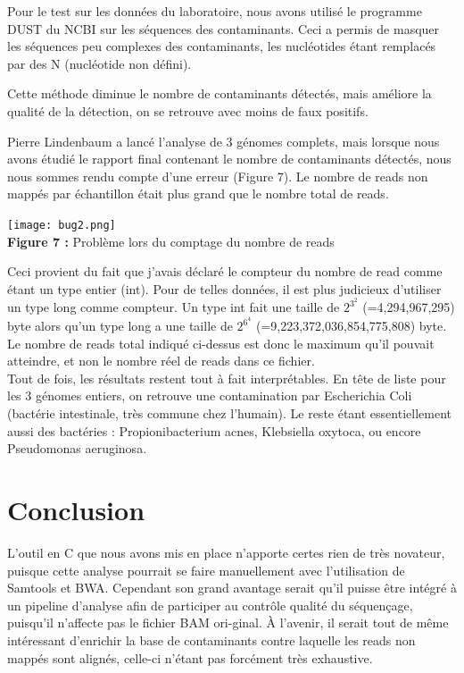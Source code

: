 \documentclass[a4paper,12pt]{article}
\begin{document}
Pour le test sur les données du laboratoire, nous avons utilisé le programme DUST du NCBI sur les séquences des contaminants. Ceci a permis de masquer les séquences peu complexes des contaminants, les nucléotides étant remplacés par des N (nucléotide non défini).

Cette méthode diminue le nombre de contaminants détectés, mais améliore la qualité de la détection, on se retrouve avec moins de faux positifs. 

Pierre Lindenbaum a lancé l'analyse de 3 génomes complets, mais lorsque nous avons étudié le rapport final contenant le nombre de contaminants détectés, nous nous sommes rendu compte d'une erreur (Figure 7). Le nombre de reads non mappés par échantillon était plus grand que le nombre total de reads. 
\begin{center}
 \texttt{[image: bug2.png]}~\\
 \textbf{Figure 7 :} Problème lors du comptage du nombre de reads
 \end{center}
Ceci provient du fait que j'avais déclaré le compteur du nombre de read comme étant un type entier (int). Pour de telles données, il est plus judicieux d'utiliser un type long comme compteur. Un type int fait une taille de $2^3^2$ (=4,294,967,295) byte alors qu'un type long a une taille de $2^6^4$ (=9,223,372,036,854,775,808) byte. Le nombre de reads total indiqué ci-dessus est donc le maximum qu'il pouvait atteindre, et non le nombre réel de reads dans ce fichier. \\

Tout de fois, les résultats restent tout à fait interprétables. En tête de liste pour les 3 génomes entiers, on retrouve une contamination par Escherichia Coli (bactérie intestinale, très commune chez l'humain). Le reste étant essentiellement aussi des bactéries : Propionibacterium acnes, Klebsiella oxytoca, ou encore Pseudomonas aeruginosa. 

\clearpage
\section{Conclusion}
L'outil en C que nous avons mis en place n'apporte  certes rien de très novateur, puisque cette analyse pourrait se faire manuellement avec l'utilisation de Samtools et BWA. Cependant son grand avantage serait qu'il puisse être intégré à un pipeline d'analyse afin de participer au contrôle qualité du séquençage, puisqu'il n'affecte pas le fichier BAM ori-ginal. À l'avenir, il serait tout de même intéressant d'enrichir la base de contaminants contre laquelle les reads non mappés sont alignés, celle-ci n'étant pas forcément très exhaustive.\\
\end{document}
